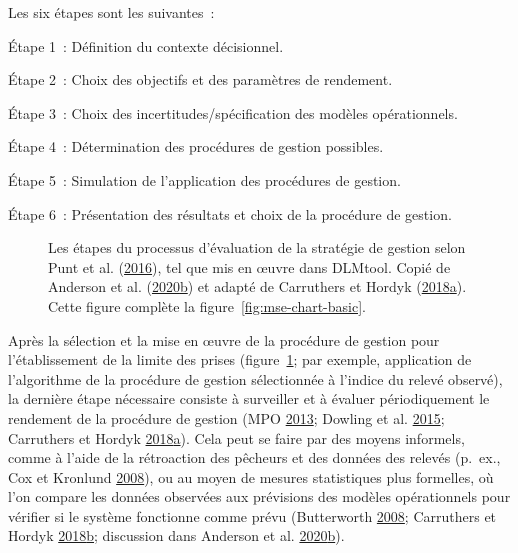 \documentclass[french,11pt]{book}
\begin{document}
Les six étapes sont les suivantes~:

Étape 1~: Définition du contexte décisionnel.

Étape 2~: Choix des objectifs et des paramètres de rendement.

Étape 3~: Choix des incertitudes/spécification des modèles opérationnels.

Étape 4~: Détermination des procédures de gestion possibles.

Étape 5~: Simulation de l'application des procédures de gestion.

Étape 6~: Présentation des résultats et choix de la procédure de gestion.

\clearpage
\begin{figure}[htb]

{\centering {} 

}

\caption{Les étapes du processus d'évaluation de la stratégie de gestion selon Punt et al. (\protect\hyperlink{ref-punt2016}{2016}), tel que mis en œuvre dans DLMtool. Copié de Anderson et al. (\protect\hyperlink{ref-anderson2020gfmp}{2020}\protect\hyperlink{ref-anderson2020gfmp}{b}) et adapté de Carruthers et Hordyk (\protect\hyperlink{ref-carruthers2018}{2018}\protect\hyperlink{ref-carruthers2018}{a}). Cette figure complète la figure~\ref{fig:mse-chart-basic}.}\label{fig:mse-chart}
\end{figure}
Après la sélection et la mise en œuvre de la procédure de gestion pour l'établissement de la limite des prises (figure~\ref{fig:mse-chart}; par exemple, application de l'algorithme de la procédure de gestion sélectionnée à l'indice du relevé observé), la dernière étape nécessaire consiste à surveiller et à évaluer périodiquement le rendement de la procédure de gestion (MPO \protect\hyperlink{ref-dfo2013}{2013}; Dowling et al. \protect\hyperlink{ref-dowling2015a}{2015}; Carruthers et Hordyk \protect\hyperlink{ref-carruthers2018}{2018}\protect\hyperlink{ref-carruthers2018}{a}). Cela peut se faire par des moyens informels, comme à l'aide de la rétroaction des pêcheurs et des données des relevés (p.~ex., Cox et Kronlund \protect\hyperlink{ref-cox2008a}{2008}), ou au moyen de mesures statistiques plus formelles, où l'on compare les données observées aux prévisions des modèles opérationnels pour vérifier si le système fonctionne comme prévu (Butterworth \protect\hyperlink{ref-butterworth2008}{2008}; Carruthers et Hordyk \protect\hyperlink{ref-carruthers_hordyk_2018}{2018}\protect\hyperlink{ref-carruthers_hordyk_2018}{b}; discussion dans Anderson et al. \protect\hyperlink{ref-anderson2020gfmp}{2020}\protect\hyperlink{ref-anderson2020gfmp}{b}).
\end{document}

